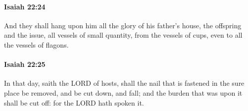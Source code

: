		\paragraph{Isaiah 22:24} %
			\label{ISAIAH-22-24}

			And they shall hang upon him all the glory of his father's house, the offspring and the issue, all vessels of small quantity, from the vessels of cups, even to all the vessels of flagons.


		\paragraph{Isaiah 22:25} %
			\label{ISAIAH-22-25}

			In that day, saith the LORD of hosts, shall the nail that is fastened in the sure place be removed, and be cut down, and fall; and the burden that was upon it shall be cut off: for the LORD hath spoken it.

